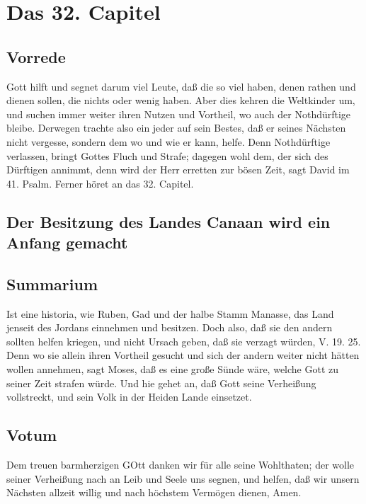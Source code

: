 \chapter{Das 32. Capitel}

\section{Vorrede}

Gott hilft und segnet darum viel Leute, daß die so viel haben, denen rathen und dienen sollen, die nichts oder wenig haben. Aber dies kehren die Weltkinder um, und suchen immer weiter ihren Nutzen und Vortheil, wo auch der Nothdürftige bleibe. Derwegen trachte also ein jeder auf sein Bestes, daß er seines Nächsten nicht vergesse, sondern dem wo und wie er kann, helfe. Denn Nothdürftige verlassen, bringt Gottes Fluch und Strafe; dagegen wohl dem, der sich des Dürftigen annimmt, denn wird der Herr erretten zur bösen Zeit, sagt David im 41. Psalm. Ferner höret an das 32. Capitel.

\section{Der Besitzung des Landes Canaan wird ein Anfang gemacht}

\section{Summarium}

Ist eine historia, wie Ruben, Gad und der halbe Stamm Manasse, das Land jenseit des Jordans einnehmen und besitzen. Doch also, daß sie den andern sollten helfen kriegen, und nicht Ursach geben, daß sie verzagt würden, V. 19. 25. Denn wo sie allein ihren Vortheil gesucht und sich der andern weiter nicht hätten wollen annehmen, sagt Moses, daß es eine große Sünde wäre, welche Gott zu seiner Zeit strafen würde. Und hie gehet an, daß Gott seine Verheißung vollstreckt, und sein Volk in der Heiden Lande einsetzet.

\section{Votum}

Dem treuen barmherzigen GOtt danken wir für alle seine Wohlthaten; der wolle seiner Verheißung nach an Leib und Seele uns segnen, und helfen, daß wir unsern Nächsten allzeit willig und nach höchstem Vermögen dienen, Amen.

